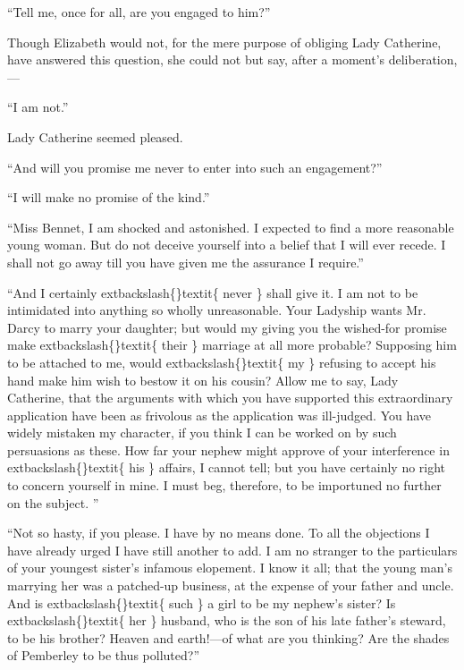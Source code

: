 \documentclass[10pt]{book}
\begin{document}
   “Tell me, once for all, are you engaged to him?”
  

   Though Elizabeth would not, for the mere purpose of obliging Lady
Catherine, have answered this question, she could not but say, after a
moment’s deliberation,—
  

   “I am not.”
  

   Lady Catherine seemed pleased.
  

   “And will you promise me never to enter into such an engagement?”
  

   “I will make no promise of the kind.”
  

   “Miss Bennet, I am shocked and astonished. I expected to find a more
reasonable young woman. But do not deceive yourself into a belief that I
will ever recede. I shall not go away till you have given me the
assurance I require.”
  

   “And I certainly
   	extbackslash\{\}textit\{
    never
   \}
   shall give it. I am not to be intimidated into
anything so wholly unreasonable. Your Ladyship wants Mr. Darcy to marry
your daughter; but would my giving you the wished-for promise make
   	extbackslash\{\}textit\{
    their
   \}
   marriage at all more probable? Supposing him to be attached to
me, would
   	extbackslash\{\}textit\{
    my
   \}
   refusing to accept his hand make him wish to bestow it on
his cousin? Allow me to say, Lady Catherine, that the arguments with
which you have supported this extraordinary application have been as
frivolous as the application was ill-judged. You have widely mistaken my
character, if you think I can be worked on by such persuasions as these.
How far your nephew might approve of your interference in
   	extbackslash\{\}textit\{
    his
   \}
   affairs,
I cannot tell; but you have certainly no right to concern yourself in
mine. I must beg, therefore, to be importuned no further on the
subject.
   ”
  

   “Not so hasty, if you please. I have by no means done. To all the
objections I have already urged I have still another to add. I am no
stranger to the particulars of your youngest sister’s infamous
elopement. I know it all; that the young man’s marrying her was a
patched-up business, at the expense of your father and uncle. And is
   	extbackslash\{\}textit\{
    such
   \}
   a girl to be my nephew’s sister? Is
   	extbackslash\{\}textit\{
    her
   \}
   husband, who is the son
of his late father’s steward, to be his brother? Heaven and earth!—of
what are you thinking? Are the shades of Pemberley to be thus polluted?”
  
\end{document}
